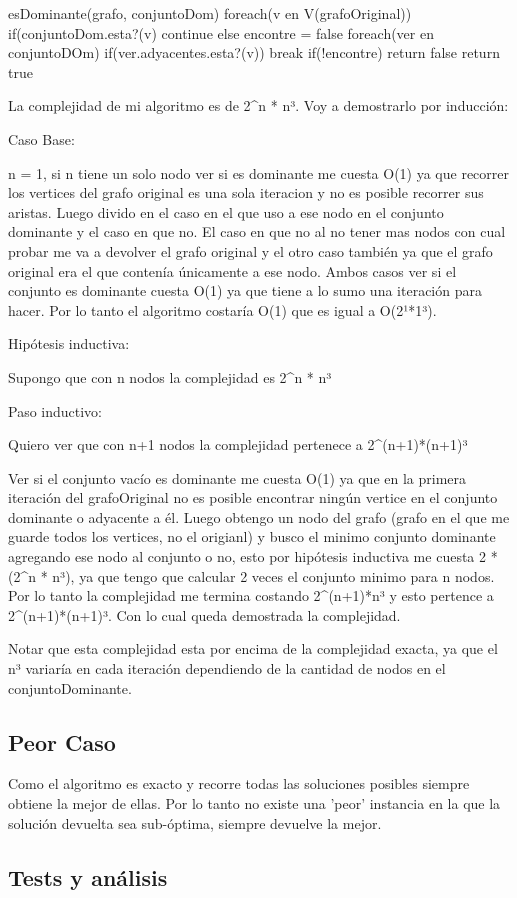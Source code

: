 esDominante(grafo, conjuntoDom){
	foreach(v en V(grafoOriginal)){
		if(conjuntoDom.esta?(v){
			continue
		}else{
			encontre = false
			foreach(ver en conjuntoDOm){
				if(ver.adyacentes.esta?(v))
					break
			}
			if(!encontre)
				return false
		}
	}
	return true
}

La complejidad de mi algoritmo es de 2^n * n³. Voy a demostrarlo por inducción:

Caso Base:

n = 1, si n tiene un solo nodo ver si es dominante me cuesta O(1) ya que recorrer los vertices del grafo original es una sola iteracion y no es posible recorrer sus aristas. Luego divido en el caso en el que uso a ese nodo en el conjunto dominante y el caso en que no. El caso en que no al no tener mas nodos con cual probar me va a devolver el grafo original y el otro caso también ya que el grafo original era el que contenía únicamente a ese nodo. Ambos casos ver si el conjunto es dominante cuesta O(1) ya que tiene a lo sumo una iteración para hacer. Por lo tanto el algoritmo costaría O(1) que es igual a O(2¹*1³).

Hipótesis inductiva:

Supongo que con n nodos la complejidad es 2^n * n³

Paso inductivo:

Quiero ver que con n+1 nodos la complejidad pertenece a 2^(n+1)*(n+1)³

Ver si el conjunto vacío es dominante me cuesta O(1) ya que en la primera iteración del grafoOriginal no es posible encontrar ningún vertice en el conjunto dominante o adyacente a él. Luego obtengo un nodo del grafo (grafo en el que me guarde todos los vertices, no el origianl) y busco el minimo conjunto dominante agregando ese nodo al conjunto o no, esto por hipótesis inductiva me cuesta 2 * (2^n * n³), ya que tengo que calcular 2 veces el conjunto minimo para n nodos. Por lo tanto la complejidad me termina costando  2^(n+1)*n³ y esto pertence a 2^(n+1)*(n+1)³. Con lo cual queda demostrada la complejidad.

Notar que esta complejidad esta por encima de la complejidad exacta, ya que el n³ variaría en cada iteración dependiendo de la cantidad de nodos en el conjuntoDominante.


\subsection{Peor Caso}

Como el algoritmo es exacto y recorre todas las soluciones posibles siempre obtiene la mejor de ellas. Por lo tanto no existe una 'peor' instancia
en la que la solución devuelta sea sub-óptima, siempre devuelve la mejor.

\subsection{Tests y análisis}



